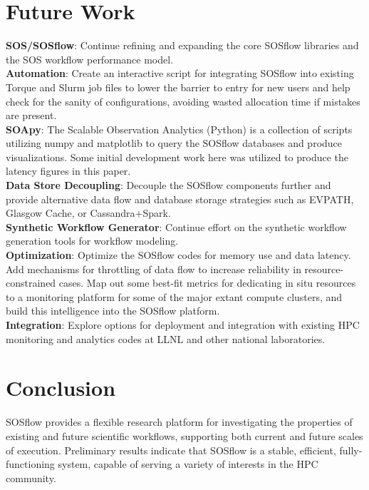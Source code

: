 

\section{Future Work} %
%
\textbf{SOS/SOSflow}: Continue refining and expanding the core SOSflow
libraries and the SOS workflow performance model.
\\
\textbf{Automation}: Create an interactive script for integrating
SOSflow into existing Torque and Slurm job files to lower the barrier
to entry for new users and help check for the sanity of configurations,
avoiding wasted allocation time if mistakes are present.
\\
\textbf{SOApy}: The Scalable Observation Analytics (Python) is a
collection of scripts utilizing numpy and matplotlib to query the
SOSflow databases and produce visualizations. Some initial development
work here was utilized to produce the latency figures in this paper.
\\
\textbf{Data Store Decoupling}: Decouple the
SOSflow components further and provide alternative data flow and
database storage strategies such as EVPATH, Glasgow Cache, or
Cassandra+Spark.
\\
\textbf{Synthetic Workflow Generator}: Continue effort on the 
synthetic workflow generation tools for workflow modeling.
\\
\textbf{Optimization}: Optimize the SOSflow codes for memory use
and data latency. Add mechanisms for throttling of data flow to
increase reliability in resource-constrained cases. Map out some
best-fit metrics for dedicating in situ resources to a monitoring
platform for some of the major extant compute clusters, and build this
intelligence into the SOSflow platform.
\\
\textbf{Integration}: Explore options for deployment and integration with
existing HPC monitoring and analytics codes at LLNL and other
national laboratories.
%
%

\section{Conclusion}
%
SOSflow provides a flexible research platform for investigating the
properties of existing and future scientific workflows, supporting
both current and future scales of execution.
%
Preliminary results indicate that SOSflow is a stable, efficient,
fully-functioning system, capable of serving a variety of interests in
the HPC community.



